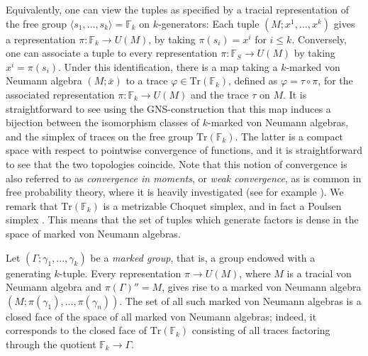 \documentclass[11pt]{amsart}
\newcommand{\Tr}[1]{\mathrm{Tr}\left(#1\right)}
\newcommand{\F}{{\mathbb{F}}}
\theoremstyle{definition}
\theoremstyle{remark}
\theoremstyle{definition}
\begin{document}
Equivalently, one can view the tuples as specified by a tracial representation of the free group $\langle s_1, \dots, s_k \rangle = \mathbb F_k$ on $k$-generators:
Each tuple $( M; x^1, \dots, x^k)$ gives a representation $\pi: \mathbb F_k \to U( M)$, by taking $\pi(s_i) = x^i$ for $i \leq k$.
Conversely, one can associate a tuple to every representation $\pi: \mathbb F_S \to U( M)$ by taking $x^i = \pi(s_i)$.
Under this identification, there is a map taking a $k$-marked von Neumann algebra $( M; \bar x)$ to a trace $\varphi \in \Tr{\mathbb F_k}$, defined as $\varphi = \tau \circ \pi$, for the associated representation $\pi: \mathbb F_k \to U( M)$ and the trace $\tau$ on $M$.
It is straightforward to see using the GNS-construction that this map induces a bijection between the isomorphism classes of $k$-marked von Neumann algebras, and the simplex of traces on the free group $\Tr{\mathbb F_k}$.
The latter is a compact space with respect to pointwise convergence of functions, and it is straightforward to see that the two topologies coincide.  
Note that this notion of convergence is also referred to as  \emph{convergence in moments}, or \emph{weak convergence}, as is common in free probability theory, where it is heavily investigated (see for example \cite[Definition 5.2.5]{Anderson_Guionnet_Zeitouni_2009}). 
We remark  that $\Tr{\mathbb F_k}$ is a metrizable Choquet simplex, and in fact a Poulsen simplex \cite{OSV}. This means that the set of tuples which generate factors is dense in the space of marked von Neumann algebras.

Let  $(\Gamma;\gamma_1 ,...,\gamma_k)$ be a  \emph{marked group}, that is, a group endowed with a generating $k$-tuple. 
Every representation $\pi \to U (M)$, where $M$ is a tracial von Neumann algebra and $\pi(\Gamma)''=M$, gives rise to a marked von Neumann algebra $(M;\pi(\gamma_1),...,\pi(\gamma_n))$. 
The set of all such marked von Neumann algebras is a closed face of the space of all marked von Neumann algebras; indeed, it corresponds to the closed face of $\Tr{\F_k}$ consisting of all traces factoring through the quotient $\F_k\to \Gamma$.
\end{document}
